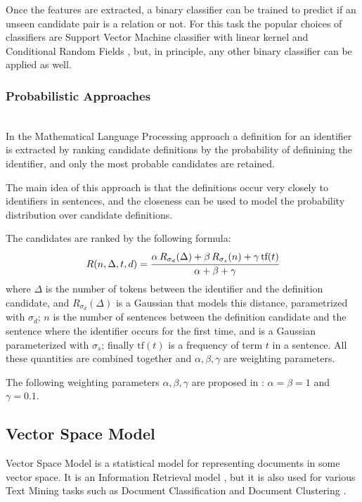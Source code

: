 Once the features are extracted, a binary classifier can be trained to predict
if an unseen candidate pair is a relation or not.
For this task the popular choices of classifiers are Support Vector Machine
classifier with linear kernel \cite{kristianto2014extracting} \cite{yokoi2011contextual}
and Conditional Random Fields \cite{kristianto2014extracting},
but, in principle, any other binary classifier can be applied
as well.


\subsubsection{Probabilistic Approaches} \label{sec:mlp} \ \\

In the Mathematical Language Processing approach \cite{pagael2014mlp}
a definition for an identifier is extracted by ranking
candidate definitions by the probability of definining
the identifier, and only the most probable candidates are retained.

The main idea of this approach is that the definitions occur very closely
to identifiers in sentences, and the closeness can be used to
model the probability distribution over candidate definitions.

The candidates are ranked by the following formula:
$$R(n, \Delta, t, d) = \cfrac{\alpha \, R_{\sigma_d}(\Delta) + \beta \, R_{\sigma_s}(n) + \gamma \, \text{tf}(t)}{\alpha + \beta + \gamma}$$
where $\Delta$ is the number of tokens between the identifier and the definition
candidate, and $R_{\sigma_d}(\Delta)$ is a Gaussian that models this distance, parametrized
with $\sigma_d$; $n$ is the number of sentences between the definition candidate
and the sentence where the identifier occurs for the first time, and is a Gaussian
parameterized with $\sigma_s$; finally $\text{tf}(t)$ is a frequency of term $t$
in a sentence. All these quantities are combined together and $\alpha, \beta, \gamma$ are weighting parameters.

The following weighting parameters $\alpha, \beta, \gamma$ are proposed in
\cite{pagael2014mlp}: $\alpha = \beta = 1$ and $\gamma = 0.1$.



\subsection{Vector Space Model} \label{sec:vsm}

Vector Space Model is a statistical model for representing documents
in some vector space. It is an Information Retrieval
model \cite{manning2008introduction}, but it is also used for various
Text Mining tasks such as Document Classification \cite{sebastiani2002machine}
and Document Clustering \cite{oikonomakou2005review} \cite{aggarwal2012survey}.

